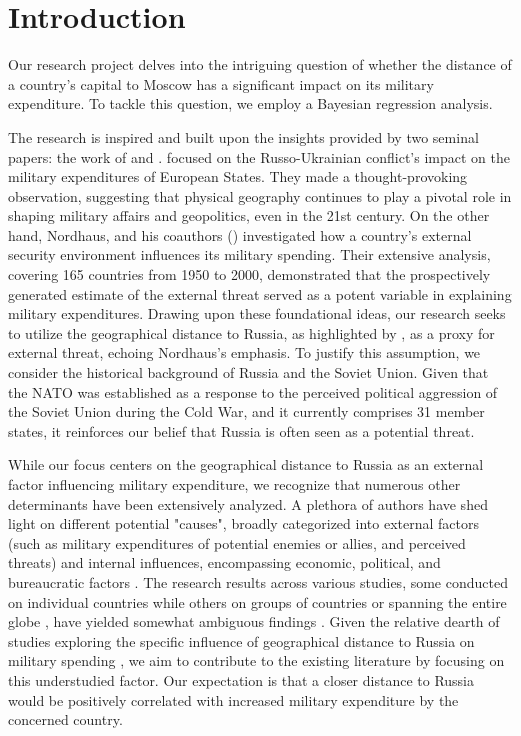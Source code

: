 \documentclass[12pt,a4paper]{article}
\begin{document}
\section{Introduction}

Our research project delves into the intriguing question of whether the distance of a country's capital to Moscow has a significant impact on its military expenditure. To tackle this question, we employ a Bayesian regression analysis.

The research is inspired and built upon the insights provided by two seminal papers: the work of \citet{kofrovn2023} and \citet{nordhaus2012}. \citet{kofrovn2023} focused on the Russo-Ukrainian conflict's impact on the military expenditures of European States. They made a thought-provoking observation, suggesting that physical geography continues to play a pivotal role in shaping military affairs and geopolitics, even in the 21st century. On the other hand, Nordhaus, and his coauthors (\citeyear{nordhaus2012}) investigated how a country's external security environment influences its military spending. Their extensive analysis, covering 165 countries from 1950 to 2000, demonstrated that the prospectively generated estimate of the external threat served as a potent variable in explaining military expenditures. Drawing upon these foundational ideas, our research seeks to utilize the geographical distance to Russia, as highlighted by \citet{kofrovn2023}, as a proxy for external threat, echoing Nordhaus's emphasis. To justify this assumption, we consider the historical background of Russia and the Soviet Union. Given that the NATO was established as a response to the perceived political aggression of the Soviet Union during the Cold War, and it currently comprises 31 member states, it reinforces our belief that Russia is often seen as a potential threat.

While our focus centers on the geographical distance to Russia as an external factor influencing military expenditure, we recognize that numerous other determinants have been extensively analyzed. A plethora of authors have shed light on different potential "causes", broadly categorized into external factors (such as military expenditures of potential enemies or allies, and perceived threats) and internal influences, encompassing economic, political, and bureaucratic factors \citep{nikolaidou2008}. The research results across various studies, some conducted on individual countries while others on groups of countries or spanning the entire globe \citep{nikolaidou2008,george2018,nordhaus2012}, have yielded somewhat ambiguous findings \citep{nikolaidou2008,odehnal2020}. 
Given the relative dearth of studies exploring the specific influence of geographical distance to Russia on military spending \citep{kofrovn2023}, we aim to contribute to the existing literature by focusing on this understudied factor. Our expectation is that a closer distance to Russia would be positively correlated with increased military expenditure by the concerned country.  
\end{document}
